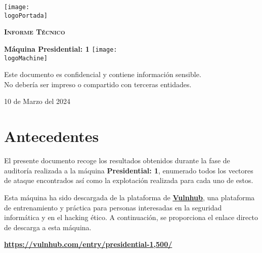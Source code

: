 \documentclass[a4paper]{article} %
\newcommand{\logoPortada}{images/vulnhub.png}
\newcommand{\machineName}{Presidential: 1}
\newcommand{\logoMachine}{images/casablanca.jpg}
\newcommand{\startDate}{10 de Marzo del 2024}
\begin{document}
  \cfoot{\thepage} %
  \begin{titlepage}
    \centering
     \texttt{[image: \\logoPortada]}\par\vspace{1cm} 
    {\scshape\LARGE \textbf{Informe Técnico}\par\vspace{0.4cm}}
    {\Huge\textcolor{bluePortada}{\textbf{Máquina \machineName}}}
    \vfill\vfill
    \texttt{[image: \\logoMachine]}\par\vspace{1cm} 
    \vfill 

    \begin{tcolorbox}[colback=red!5!white,colframe=red!75!black]
      \centering
      Este documento es confidencial y contiene información sensible. \\ No debería ser 
      impreso o compartido con terceras entidades.
    \end{tcolorbox}
    
    \vfill 
    {\large \startDate\par}
    \vfill 
  \end{titlepage}

  \clearpage
  \tableofcontents
  \clearpage
  \section{Antecedentes}
  El presente documento recoge los resultados obtenidos durante la fase de auditoría realizada a la 
  máquina \textbf{\machineName}, enumerado todos los vectores de ataque encontrados así como la 
  explotación realizada para cada uno de estos.

  Esta máquina ha sido descargada de la plataforma de \href{https://vulnhub.com}{\textbf{\color{bluePortada}Vulnhub}}, 
  una plataforma de entrenamiento y práctica para personas interesadas en la seguridad informática y en el hacking 
  ético. 
  A continuación, se proporciona el enlace directo de descarga a esta máquina.

  \vspace{0.2cm}

  \begin{tcolorbox}[enhanced,attach boxed title to top center={yshift=-3mm,yshifttext=-1mm},
    colback=blue!5!white,colframe=blue!75!black,colbacktitle=bluePortada!80!black,
    title=Dirección URL, fonttitle=\bfseries,
    boxed title style={size=small, colframe=red!50!black} ]
    \centering
    \href{https://www.vulnhub.com/entry/presidential-1,500/}{\textbf{\color{bluePortada}https://vulnhub.com/entry/presidential-1,500/}}
  \end{tcolorbox}
\end{document}
